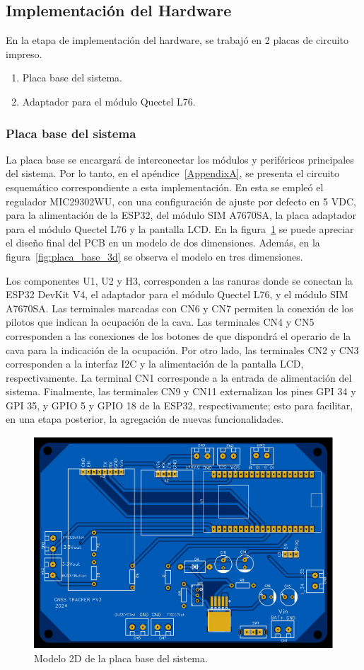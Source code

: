 \subsection{Implementación del Hardware}

En la etapa de implementación del hardware, se trabajó en 2 placas de circuito impreso. 

\begin{enumerate}
    \item Placa base del sistema.
    \item Adaptador para el módulo Quectel L76.
\end{enumerate}



\subsubsection{Placa base del sistema}

La placa base se encargará de interconectar los módulos y periféricos principales del sistema. Por lo tanto, en el apéndice~\ref{AppendixA}, se presenta el circuito esquemático correspondiente a esta implementación. En esta se empleó el regulador MIC29302WU, con una configuración de ajuste por defecto en 5 VDC, para la alimentación de la ESP32, del módulo SIM A7670SA, la placa adaptador para el módulo Quectel L76 y la pantalla LCD. En la figura~\ref{fig:placa_base_2d} se puede apreciar el diseño final del PCB en un modelo de dos dimensiones. Además, en la figura~\ref{fig:placa_base_3d} se observa el modelo en tres dimensiones. 

Los componentes U1, U2 y H3, corresponden a las ranuras donde se conectan la ESP32 DevKit V4, el adaptador para el módulo Quectel L76, y el módulo SIM A7670SA. Las terminales marcadas con CN6 y CN7 permiten la conexión de los pilotos que indican la ocupación de la cava. Las terminales CN4 y CN5 corresponden a las conexiones de los botones de que dispondrá el operario de la cava para la indicación de la ocupación. Por otro lado, las terminales CN2 y CN3 corresponden a la interfaz I2C y la alimentación de la pantalla LCD, respectivamente. La terminal CN1 corresponde a la entrada de alimentación del sistema. Finalmente, las terminales CN9 y CN11 externalizan los pines GPI 34 y GPI 35, y GPIO 5 y GPIO 18 de la ESP32, respectivamente; esto para facilitar, en una etapa posterior, la agregación de nuevas funcionalidades. 

\begin{figure}[htbp]
	\centering
	\includegraphics[width=.5\textwidth]{./Figures/PCB_TFE_Modelo_2D.png}
	\caption{Modelo 2D de la placa base del sistema.}
	\label{fig:placa_base_2d}
\end{figure}

